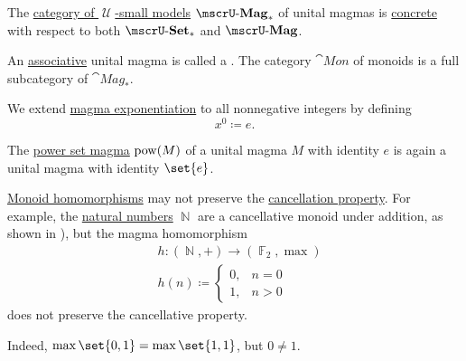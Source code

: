\begin{definition}
\begin{thmenum}
     The \hyperref[def:category_of_small_first_order_models]{category of \( \mscrU \)-small models} \( \ucat{Mag}_* \) of unital magmas is \hyperref[def:concrete_category]{concrete} with respect to both \hyperref[def:pointed_set/category]{\( \ucat{Set}_* \)} and \hyperref[def:magma/category]{\( \ucat{Mag} \)}.

     An \hyperref[eq:def:magma/associative]{associative} unital magma is called a . The category \( \cat{Mon} \) of monoids is a full subcategory of \( \cat{Mag}_* \).

     We extend \hyperref[def:magma/exponentiation]{magma exponentiation} to all nonnegative integers by defining
    \begin{equation*}
      x^0 \coloneqq e.
    \end{equation*}

     The \hyperref[def:magma/power_set]{power set magma} \( \operatorname{pow}(M) \) of a unital magma \( M \) with identity \( e \) is again a unital magma with identity \( \set{ e } \).
  \end{thmenum}
\end{definition}

\begin{example}\label{ex:monoid_cancellation_not_preserved_by_homomorphism}
  \hyperref[def:unital_magma/homomorphism]{Monoid homomorphisms} may not preserve the \hyperref[def:magma/cancellative]{cancellation property}. For example, the \hyperref[def:set_of_natural_numbers]{natural numbers} \( \BbbN \) are a cancellative monoid under addition, as shown in ), but the magma homomorphism
  \begin{equation*}
    \begin{aligned}
      &h: (\BbbN, +) \to (\hyperref[thm:galois_field_existence]{\BbbF_2}, \max) \\
      &h(n) \coloneqq \begin{cases}
        0, &n = 0 \\
        1, &n > 0
      \end{cases}
    \end{aligned}
  \end{equation*}
  does not preserve the cancellative property.

  Indeed, \( \max\set{ 0, 1} = \max\set{ 1, 1 } \), but \( 0 \neq 1 \).
\end{example}

